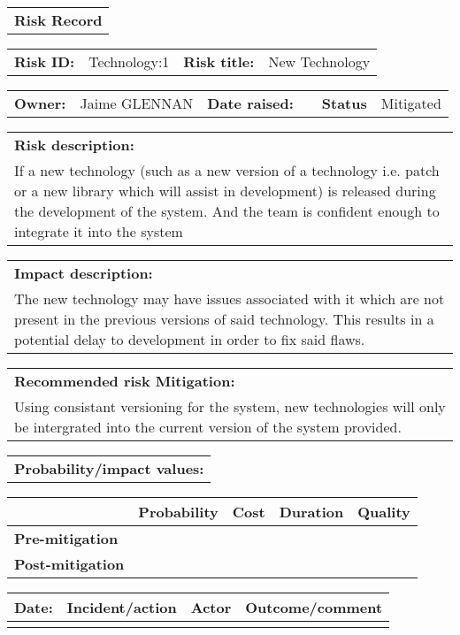 \begin{table}%
	\begin{tabularx}{\textwidth}{| X |}
		\hline
		\textbf{Risk Record} \\
	\end{tabularx}
	\begin{tabularx}{\textwidth}{| l | X | l | X |}
		\hline
		\textbf{Risk ID:} & Technology:1 & \textbf{Risk title:} & New Technology  \\
	\end{tabularx}
	\begin{tabularx}{\textwidth}{| l | X | l | X | l | X |}
		\hline
		\textbf{Owner:} & Jaime GLENNAN & \textbf{Date raised:} &  & \textbf{Status} & Mitigated \\
	\end{tabularx}
	\begin{tabularx}{\textwidth}{| X |}
		\hline
		\textbf{Risk description:} \\ If a new technology (such as a new version of a technology i.e. patch or a new library which will assist in development) is released during the development of the system. And the team is confident enough to integrate it into the system   \\
	\end{tabularx}
	\begin{tabularx}{\textwidth}{| X |}
		\hline
		\textbf{Impact description:} \\ The new technology may have issues associated with it which are not present in the previous versions of said technology. This results in a potential delay to development in order to fix said flaws.\\
	\end{tabularx}
	\begin{tabularx}{\textwidth}{| X |}
		\hline
		\textbf{Recommended risk Mitigation:} \\ Using consistant versioning for the system, new technologies will only be intergrated into the current version of the system provided. \\
	\end{tabularx}
	\begin{tabularx}{\textwidth}{| X |}
		\hline
		\textbf{Probability/impact values:} \\
	\end{tabularx}
	\begin{tabularx}{\textwidth}{| l | l | X | X | X |}
		\hline
		 &  \textbf{Probability} & \textbf{Cost} & \textbf{Duration} & \textbf{Quality} \\ \hline
		\textbf{Pre-mitigation} & & & & \\ \hline
		\textbf{Post-mitigation} & & & & \\ \hline \hline
	\end{tabularx}
	\begin{tabularx}{\textwidth}{| l | X | l | X |}
		\hline
		\textbf{Date:} & \textbf{Incident/action} & \textbf{Actor} & \textbf{Outcome/comment} \\ \hline
		 &  &  &  \\ \hline
	\end{tabularx}
\end{table}

